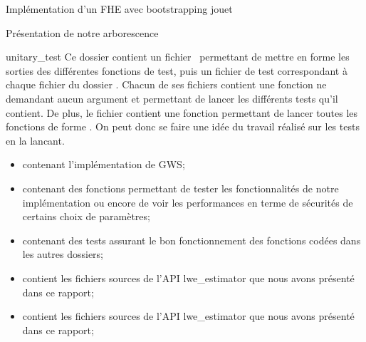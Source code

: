 \begin{section}{Implémentation d'un FHE avec bootstrapping \og{} jouet\fg{}}
\begin{subsection}{Présentation de notre arborescence}
\begin{subsubsection}{unitary\_test}
Ce dossier contient un fichier  permettant de mettre 
en forme les sorties des différentes fonctions de test, puis un fichier 
de test correspondant à chaque fichier du dossier .
Chacun de ses fichiers contient une fonction 
ne demandant aucun argument et permettant de lancer les différents 
tests qu'il contient. De plus, le fichier 
contient une fonction  permettant de lancer toutes 
les fonctions de forme . On peut donc se faire une
idée du travail réalisé sur les tests en la lancant.
\begin{itemize}
\item {} contenant l'implémentation de GWS;
\item {} contenant des fonctions permettant 
	de tester les fonctionnalités de notre implémentation 
	ou encore de voir les performances 
	en terme de sécurités de certains choix de paramètres;
\item {} contenant des tests assurant le bon fonctionnement
	des fonctions codées dans les autres dossiers; 
\item {} contient les fichiers sources de l'API
	lwe\_estimator que nous avons présenté dans ce rapport; 
\item {} contient les fichiers sources de l'API
	lwe\_estimator que nous avons présenté dans ce rapport; 
\end{itemize}
\end{subsubsection} %

\end{subsection}
\end{section}
